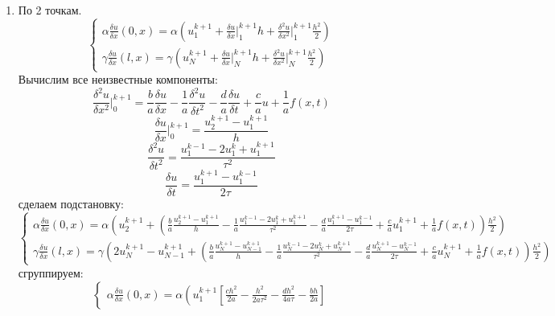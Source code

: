 \documentclass[12pt]{article}
\begin{document}
\begin{enumerate}
        \item По 2 точкам.
        \begin{equation*}
            \begin{cases}
                \alpha\frac{\delta u}{\delta x}(0,x) = \alpha\left( u_1^{k+1} + \frac{\delta u}{\delta x}\bigg|_{1}^{k+1}h+\frac{\delta^2 u}{\delta x^2}\bigg|_{1}^{k+1}\frac{h^2}{2}\right)
                \\
                \gamma\frac{\delta u}{\delta x}(l,x) = \gamma\left( u_N^{k+1} + \frac{\delta u}{\delta x}\bigg|_{N}^{k+1}h+\frac{\delta^2 u}{\delta x^2}\bigg|_{N}^{k+1}\frac{h^2}{2}\right)
            \end{cases}
        \end{equation*}
        Вычислим все неизвестные компоненты:\\
        $$\frac{\delta^2 u}{\delta x^2}\bigg|_{0}^{k+1} =\frac{b}{a}\frac{\delta u}{\delta x}-\frac{1}{a}\frac{\delta^2 u}{\delta t^2}- \frac{d}{a}\frac{\delta u}{\delta t}+\frac{c}{a}u+\frac{1}{a}f(x,t)$$
        $$\frac{\delta u}{\delta x}\bigg|_{0}^{k+1} = \frac{u_{2}^{k+1}-u_{1}^{k+1}}{h}$$
        $$\frac{\delta^2 u}{\delta t^2} = \frac{u_{1}^{k-1}-2u_{1}^k+u_{1}^{k+1}}{\tau^2}$$
        $$\frac{\delta u}{\delta t}=\frac{u_1^{k+1}-u_1^{k-1}}{2\tau}$$
        сделаем подстановку:
        \begin{equation*}
            \begin{cases}
                \alpha\frac{\delta u}{\delta x}(0,x) = \alpha\left(u_{2}^{k+1}+\left(\frac{b}{a}\frac{u_{2}^{k+1}-u_{1}^{k+1}}{h}-
                \frac{1}{a}\frac{u_{1}^{k-1}-2u_{1}^k+u_{1}^{k+1}}{\tau^2}- \frac{d}{a}\frac{u_1^{k+1}-u_1^{k-1}}{2\tau}+\frac{c}{a}u_1^{k+1}+
                \frac{1}{a}f(x,t)\right)\frac{h^2}{2}\right)
                \\
                \gamma\frac{\delta u}{\delta x}(l,x) = \gamma\left( 2u_N^{k+1} -u_{N-1}^{k+1}+\left(\frac{b}{a}\frac{u_{N}^{k+1}-
                u_{N-1}^{k+1}}{h}-\frac{1}{a}\frac{u_{N}^{k-1}-2u_{N}^k+u_{N}^{k+1}}{\tau^2}- \frac{d}{a}\frac{u_N^{k+1}-u_N^{k-1}}{2\tau}+\frac{c}{a}u_N^{k+1}
                +\frac{1}{a}f(x,t) \right)\frac{h^2}{2}\right)
            \end{cases}
        \end{equation*}
        сгруппируем:
        \begin{equation*}
            \begin{cases}
                \alpha\frac{\delta u}{\delta x}(0,x) = \alpha\left( u_1^{k+1}\left[ \frac{ch^2}{2a}-\frac{h^2}{2a\tau^2}-\frac{dh^2}{4a\tau}-\frac{bh}{2a} \right]

\end{cases}
\end{equation*}
\end{enumerate}
\end{document}
